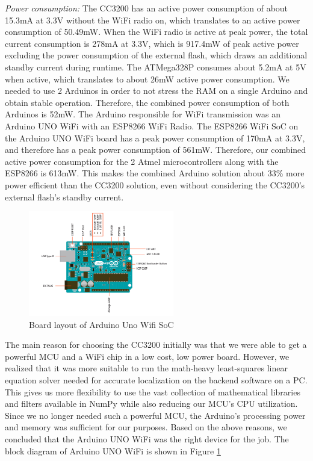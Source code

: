 \documentclass[journal,transmag]{IEEEtran}
\begin{document}
\textit{Power consumption:}
The CC3200 has an active power consumption of about 15.3mA at 3.3V without the WiFi radio on, which translates to an active power consumption of 50.49mW. When the WiFi radio is active at peak power, the total current consumption is 278mA at 3.3V, which is 917.4mW of peak active power excluding the power consumption of the external flash, which draws an additional standby current during runtime.
The ATMega328P consumes about 5.2mA at 5V when active, which translates to about 26mW active power consumption.  We needed to use 2 Arduinos in order to not stress the RAM on a single Arduino and obtain stable operation.  Therefore, the combined power consumption of both Arduinos is 52mW.  The Arduino responsible for WiFi transmission was an Arduino UNO WiFi with an ESP8266 WiFi Radio. The ESP8266 WiFi SoC on the Arduino UNO WiFi board has a peak power consumption of 170mA at 3.3V, and therefore has a peak power consumption of 561mW.  Therefore, our combined active power consumption for the 2 Atmel microcontrollers along with the ESP8266 is 613mW.  This makes the combined Arduino solution about 33\% more power efficient than the CC3200 solution, even without considering the CC3200's external flash's standby current. \\
\begin{figure}[!h]
\centering
\includegraphics[width=2.5in]{arduinounobd}
\caption{{Board layout of Arduino Uno Wifi SoC}}
\label{arduinoBD}
\end{figure}
The main reason for choosing the CC3200 initially was that we were able to get a powerful MCU and a WiFi chip in a low cost, low power board.  However, we realized that it was more suitable to run the math-heavy least-squares linear equation solver needed for accurate localization on the backend software on a PC.  This gives us more flexibility to use the vast collection of mathematical libraries and filters available in NumPy while also reducing our MCU's CPU utilization.  Since we no longer needed such a powerful MCU, the Arduino's processing power and memory was sufficient for our purposes.  Based on the above reasons, we concluded that the Arduino UNO WiFi was the right device for the job. The block diagram of Arduino UNO WiFi is shown in Figure \ref{arduinoBD}\\
\end{document}
